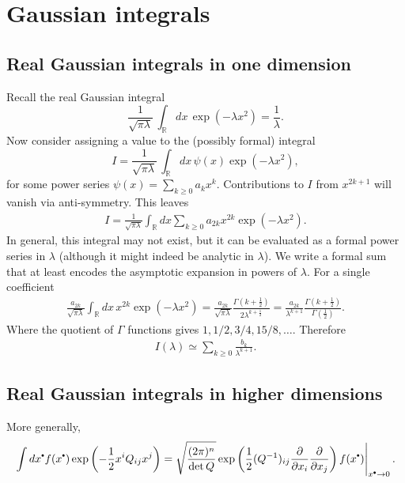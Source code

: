 \chapter{Gaussian integrals}
\section{Real Gaussian integrals in one dimension}
Recall the real Gaussian integral
\[ \frac{1}{\sqrt{\pi \lambda}}\, \int_{\mathbb{R}} dx\, \exp(-\lambda x^2) = \frac{1}{\lambda}. \] 
Now consider assigning a value to the (possibly formal) integral 
\[ I = \frac{1}{\sqrt{\pi \lambda}}\, \int_{\mathbb{R}} dx\, \psi(x) \exp(-\lambda x^2),\]
for some power series \( \psi(x)=\sum_{k \geq 0} a_k x^k\). Contributions to \(I\) from \( x^{2k+1}\) will vanish via anti-symmetry. This leaves
\begin{align*}
    I = \frac{1}{\sqrt{\pi \lambda}} \int_{\mathbb{R}} dx \sum_{k \geq 0} a_{2k} x^{2k} \exp( - \lambda x^2).
\end{align*}
In general, this integral may not exist, but it can be evaluated as a formal power series in \( \lambda\) (although it might indeed be analytic in \( \lambda\)). We write a formal sum that at least encodes the asymptotic expansion in powers of \( \lambda\). For a single coefficient
\begin{align*}
    \frac{a_{2k} }{\sqrt{\pi \lambda}} \int_{\mathbb{R}} dx \, x^{2k} \exp(- \lambda x^2) =  \frac{a_{2k} }{\sqrt{\pi \lambda}} \frac{\Gamma\left(k + \frac{1}{2}\right)}{2 \lambda^{k+\frac{1}{2}}} = \frac{a_{2k}}{\lambda^{k+1} } \frac{\Gamma\left(k+\frac{1}{2}\right)}{\Gamma\left(\frac{1}{2}\right) }.
\end{align*}
Where the quotient of \(\Gamma\) functions gives \( 1, 1/2, 3/4, 15/8, \dots \). 
Therefore
\begin{align*}
    I(\lambda) \simeq \sum_{k \geq 0} \frac{b_k}{\lambda^{k+1}}.
\end{align*}

\section{Real Gaussian integrals in higher dimensions}

More generally, 
\[ \left. \int dx^{\sbt} f(x^{\sbt}) \exp\left( -\frac{1}{2} x^i Q_{ij} x^j \right) = \sqrt{\frac{(2 \pi)^n}{\det Q}} \exp\left( \frac{1}{2} (Q^{-1})_{ij} \frac{\partial}{\partial x_i} \frac{\partial}{\partial x_j} \right) f(x^{\sbt})  \right|_{x^{\sbt} \rightarrow 0}. \]

